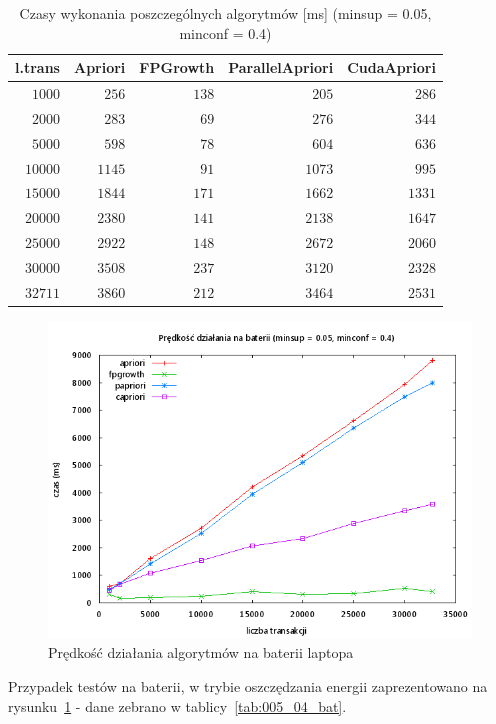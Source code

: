 \begin{table}
	\centering
	\begin{tabular}{r|r|r|r|r}
	\textbf{l.trans} & \textbf{Apriori} & \textbf{FPGrowth} & \textbf{ParallelApriori} & \textbf{CudaApriori}  \\ \hline
	$1000$ & $256$ & $138$ & $205$ & $286$ \\
	$2000$ & $283$ & $69$ & $276$ & $344$ \\
	$5000$ & $598$ & $78$ & $604$ & $636$ \\
	$10000$ & $1145$ & $91$ & $1073$ & $995$ \\
	$15000$ & $1844$ & $171$ & $1662$ & $1331$ \\
	$20000$ & $2380$ & $141$ & $2138$ & $1647$ \\
	$25000$ & $2922$ & $148$ & $2672$ & $2060$ \\
	$30000$ & $3508$ & $237$ & $3120$ & $2328$ \\
	$32711$ & $3860$ & $212$ & $3464$ & $2531$ \\
	\end{tabular}
	\caption{Czasy wykonania poszczególnych algorytmów [ms] (minsup = 0.05, minconf = 0.4)\label{tab:005_04}}
\end{table}

\begin{figure}[H]
\centering
\includegraphics[width=1\textwidth]{figures/06/005_04_bat.png}
\caption{Prędkość działania algorytmów na baterii laptopa\label{rys:005_04_bat}}
\end{figure}

Przypadek testów na baterii, w trybie oszczędzania energii zaprezentowano na rysunku~\ref{rys:005_04_bat} - dane zebrano w tablicy~\ref{tab:005_04_bat}. 

